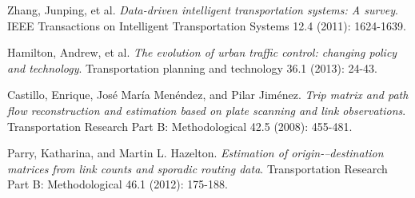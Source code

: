 \documentclass[twoside,leqno,twocolumn]{article}
\begin{document}


\begin{thebibliography}{99}

Zhang, Junping, et al. {\em Data-driven intelligent transportation systems: A survey}. IEEE Transactions on Intelligent Transportation Systems 12.4 (2011): 1624-1639.

Hamilton, Andrew, et al. {\em The evolution of urban traffic control: changing policy and technology}. Transportation planning and technology 36.1 (2013): 24-43.

Castillo, Enrique, José María Menéndez, and Pilar Jiménez. {\em Trip matrix and path flow reconstruction and estimation based on plate scanning and link observations}. Transportation Research Part B: Methodological 42.5 (2008): 455-481.

Parry, Katharina, and Martin L. Hazelton. {\em Estimation of origin-–destination matrices from link counts and sporadic routing data}. Transportation Research Part B: Methodological 46.1 (2012): 175-188.

%

\end{thebibliography}
\end{document}
